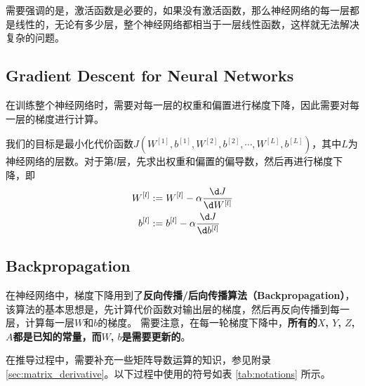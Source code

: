 需要强调的是，激活函数是必要的，如果没有激活函数，那么神经网络的每一层都是线性的，无论有多少层，整个神经网络都相当于一层线性函数，这样就无法解决复杂的问题。

\subsection{Gradient Descent for Neural Networks}
在训练整个神经网络时，需要对每一层的权重和偏置进行梯度下降，因此需要对每一层的梯度进行计算。

我们的目标是最小化代价函数$J(W^{[1]}, b^{[1]}, W^{[2]}, b^{[2]}, \cdots, W^{[L]}, b^{[L]})$，其中$L$为神经网络的层数。对于第$l$层，先求出权重和偏置的偏导数，然后再进行梯度下降，即
\begin{equation}
    \begin{aligned}
        W^{[l]} &:= W^{[l]} - \alpha \frac{\d J}{\d W^{[l]}} \\
        b^{[l]} &:= b^{[l]} - \alpha \frac{\d J}{\d b^{[l]}}
    \end{aligned}
\end{equation}

\subsection{Backpropagation}
在神经网络中，梯度下降用到了\textbf{反向传播/后向传播算法（Backpropagation）}，该算法的基本思想是，先计算代价函数对输出层的梯度，然后再反向传播到每一层，计算每一层$W$和$b$的梯度。
需要注意，在每一轮梯度下降中，\textbf{所有的$X$, $Y$, $Z$, $A$都是已知的常量，而$W$, $b$是需要更新的}。

在推导过程中，需要补充一些矩阵导数运算的知识，参见附录 \ref{sec:matrix_derivative}。以下过程中使用的符号如表 \ref{tab:notations} 所示。

